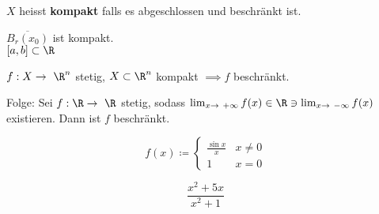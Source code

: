 \begin{def*}[note = kompakt , index = kompakt]
	$X$ heisst \textbf{kompakt} falls es abgeschlossen und beschränkt ist.
\end{def*}
\begin{bsp*}
	$\overline{B_r(x_0)}$ ist kompakt. \\
	$[a,b] \subset \R$
\end{bsp*}
\begin{satz*}
	$f: X \rightarrow \R^n$ stetig, $X \subset \R^n$ kompakt $\implies f$ beschränkt.
	
	Folge: Sei $f: \R \rightarrow \R$ stetig, sodass $\lim_{x \rightarrow +\infty} f(x) \in \R \ni \lim_{x \rightarrow -\infty} f(x)$ existieren. Dann ist $f$ beschränkt.
\end{satz*}
\begin{bsp*}
	\[ f(x) \coloneqq \begin{cases}
		\frac{\sin x}{x}	&x \neq 0	\\
		1			&x = 0	
	\end{cases} \]
\end{bsp*}
\begin{bsp*}
	\[ \frac{x^2 + 5x}{x^2 + 1} \]
\end{bsp*}
